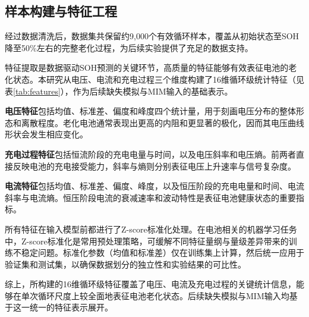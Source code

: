 \documentclass[10pt,a4paper]{ctexart}
\begin{document}
\subsection{样本构建与特征工程}

经过数据清洗后，数据集共保留约9,000个有效循环样本，覆盖从初始状态至SOH降至50\%左右的完整老化过程，为后续实验提供了充足的数据支持。

特征提取是数据驱动SOH预测的关键环节，高质量的特征能够有效表征电池的老化状态\cite{sun2025batteryhealth,wang2022chargingfeatures}。本研究从电压、电流和充电过程三个维度构建了16维循环级统计特征（见表\ref{tab:features}），作为后续缺失模拟与MIM输入的基础表示。

\textbf{电压特征}包括均值、标准差、偏度和峰度四个统计量，用于刻画电压分布的整体形态和离散程度。老化电池通常表现出更高的内阻和更显著的极化，因而其电压曲线形状会发生相应变化。

\textbf{充电过程特征}包括恒流阶段的充电电量与时间，以及电压斜率和电压熵。前两者直接反映电池的充电接受能力，斜率与熵则分别表征电压上升速率与信号复杂度。

\textbf{电流特征}包括均值、标准差、偏度、峰度，以及恒压阶段的充电电量和时间、电流斜率与电流熵。恒压阶段电流的衰减速率和波动特性是表征电池健康状态的重要指标。

所有特征在输入模型前都进行了Z-score标准化处理。在电池相关的机器学习任务中，Z-score标准化是常用预处理策略，可缓解不同特征量纲与量级差异带来的训练不稳定问题\cite{xue2024batteryml}。标准化参数（均值和标准差）仅在训练集上计算，然后统一应用于验证集和测试集，以确保数据划分的独立性和实验结果的可比性。

综上，所构建的16维循环级特征覆盖了电压、电流及充电过程的关键统计信息，能够在单次循环尺度上较全面地表征电池老化状态。后续缺失模拟与MIM输入均基于这一统一的特征表示展开。
\end{document}
